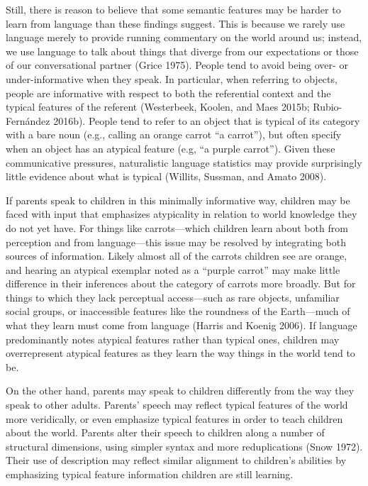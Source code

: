 \documentclass{ucetd}
\begin{document}
Still, there is reason to believe that some semantic features may be
harder to learn from language than these findings suggest. This is
because we rarely use language merely to provide running commentary on
the world around us; instead, we use language to talk about things that
diverge from our expectations or those of our conversational partner
(Grice 1975). People tend to avoid being over- or under-informative when
they speak. In particular, when referring to objects, people are
informative with respect to both the referential context and the typical
features of the referent (Westerbeek, Koolen, and Maes 2015b;
Rubio-Fernández 2016b). People tend to refer to an object that is
typical of its category with a bare noun (e.g., calling an orange carrot
``a carrot''), but often specify when an object has an atypical feature
(e.g, ``a purple carrot''). Given these communicative pressures,
naturalistic language statistics may provide surprisingly little
evidence about what is typical (Willits, Sussman, and Amato 2008).

If parents speak to children in this minimally informative way, children
may be faced with input that emphasizes atypicality in relation to world
knowledge they do not yet have. For things like carrots---which children
learn about both from perception and from language---this issue may be
resolved by integrating both sources of information. Likely almost all
of the carrots children see are orange, and hearing an atypical exemplar
noted as a ``purple carrot'' may make little difference in their
inferences about the category of carrots more broadly. But for things to
which they lack perceptual access---such as rare objects, unfamiliar
social groups, or inaccessible features like the roundness of the
Earth---much of what they learn must come from language (Harris and
Koenig 2006). If language predominantly notes atypical features rather
than typical ones, children may overrepresent atypical features as they
learn the way things in the world tend to be.

On the other hand, parents may speak to children differently from the
way they speak to other adults. Parents' speech may reflect typical
features of the world more veridically, or even emphasize typical
features in order to teach children about the world. Parents alter their
speech to children along a number of structural dimensions, using
simpler syntax and more reduplications (Snow 1972). Their use of
description may reflect similar alignment to children's abilities by
emphasizing typical feature information children are still learning.
\end{document}
